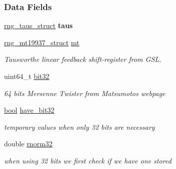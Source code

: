 \subsubsection*{Data Fields}
\begin{DoxyCompactItemize}
\item 
\mbox{\label{structbiomcmc__rng__struct_a8d4d5fdf7a1c52aabb06b39446c3ed93}} 
\hyperlink{structrng__taus__struct}{rng\+\_\+taus\+\_\+struct} {\bfseries taus}
\item 
\mbox{\label{structbiomcmc__rng__struct_a0d35534d56f6c0b57d76495319e8f219}} 
\hyperlink{structrng__mt19937__struct}{rng\+\_\+mt19937\+\_\+struct} \hyperlink{structbiomcmc__rng__struct_a0d35534d56f6c0b57d76495319e8f219}{mt}
\begin{DoxyCompactList}\small\item\em Tausworthe linear feedback shift-\/register from G\+SL. \end{DoxyCompactList}\item 
\mbox{\label{structbiomcmc__rng__struct_ae26faaf87d679a2b9236ba303471cee2}} 
uint64\+\_\+t \hyperlink{structbiomcmc__rng__struct_ae26faaf87d679a2b9236ba303471cee2}{bit32}
\begin{DoxyCompactList}\small\item\em 64 bits Mersenne Twister from Matsumoto\textquotesingle{}s webpage \end{DoxyCompactList}\item 
\mbox{\label{structbiomcmc__rng__struct_ae0279edd5e5e20a4784ef67a6e57a638}} 
\hyperlink{lowlevel_8h_a97a80ca1602ebf2303258971a2c938e2}{bool} \hyperlink{structbiomcmc__rng__struct_ae0279edd5e5e20a4784ef67a6e57a638}{have\+\_\+bit32}
\begin{DoxyCompactList}\small\item\em temporary values when only 32 bits are necessary \end{DoxyCompactList}\item 
\mbox{\label{structbiomcmc__rng__struct_a387dd92d4bb3218530d7187fdb23a113}} 
double \hyperlink{structbiomcmc__rng__struct_a387dd92d4bb3218530d7187fdb23a113}{rnorm32}
\begin{DoxyCompactList}\small\item\em when using 32 bits we first check if we have one stored \end{DoxyCompactList}\item 

\end{DoxyCompactItemize}
